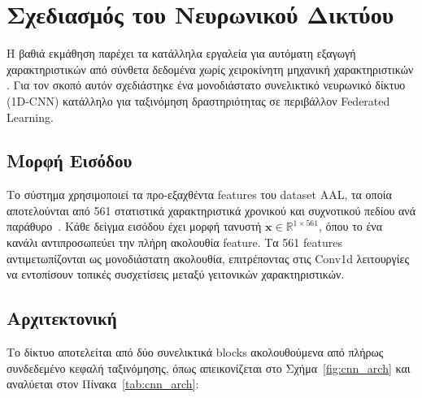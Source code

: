
\section{Σχεδιασμός του Νευρωνικού Δικτύου}
\label{sec:cnn_design}

Η βαθιά εκμάθηση παρέχει τα κατάλληλα εργαλεία για αυτόματη εξαγωγή χαρακτηριστικών από σύνθετα δεδομένα χωρίς χειροκίνητη μηχανική χαρακτηριστικών \cite{Goodfellow2016}. Για τον σκοπό αυτόν σχεδιάστηκε ένα μονοδιάστατο συνελικτικό νευρωνικό δίκτυο (1D-CNN) κατάλληλο για ταξινόμηση δραστηριότητας σε περιβάλλον Federated Learning.

\subsection{Μορφή Εισόδου}

Το σύστημα χρησιμοποιεί τα προ-εξαχθέντα features του dataset AAL, τα οποία αποτελούνται από 561 στατιστικά χαρακτηριστικά χρονικού και συχνοτικού πεδίου ανά παράθυρο~\cite{AAL_UCI2016}. Κάθε δείγμα εισόδου έχει μορφή τανυστή $\mathbf{x} \in \mathbb{R}^{1 \times 561}$, όπου το ένα κανάλι αντιπροσωπεύει την πλήρη ακολουθία feature. Τα 561 features αντιμετωπίζονται ως μονοδιάστατη ακολουθία, επιτρέποντας στις Conv1d λειτουργίες να εντοπίσουν τοπικές συσχετίσεις μεταξύ γειτονικών χαρακτηριστικών.

\subsection{Αρχιτεκτονική}

Το δίκτυο αποτελείται από δύο συνελικτικά blocks ακολουθούμενα από πλήρως συνδεδεμένο κεφαλή ταξινόμησης, όπως απεικονίζεται στο Σχήμα~\ref{fig:cnn_arch} και αναλύεται στον Πίνακα~\ref{tab:cnn_arch}:


